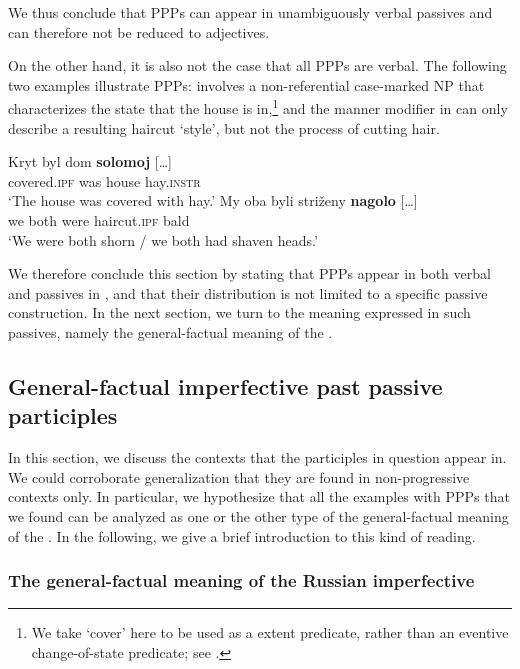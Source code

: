 \documentclass[output=paper,modfonts,newtxmath,hidelinks
\ChapterDOI{10.5281/zenodo.2545513}
]{langscibook}
\begin{document}
\noindent We thus conclude that  PPPs can appear in unambiguously verbal passives and can therefore not be reduced to adjectives. 

On the other hand, it is also not the case that all  PPPs are verbal. The following two examples illustrate  PPPs:  involves a non-referential  case-marked NP that characterizes the state that the house is in,\footnote{We take `cover' here to be used as a  extent predicate, rather than an eventive change-of-state predicate; see \citet{gawron09}.} and the  manner modifier in  can only describe a resulting haircut `style', but not the process of cutting hair.

\ea\label{kryt}
\ea\gll 	Kryt byl dom \textbf{solomoj} [\dots]\\ 		
	covered.\textsc{ipf} was house hay.\textsc{instr} 	\\
\glt	`The house was covered with hay.'\label{kryta}
\ex\gll	My oba byli striženy \textbf{nagolo} [\dots]\\
	we both were haircut.\textsc{ipf} bald\\
\glt	`We were both shorn / we both had shaven heads.'\label{nagolo} 
\z\z

\noindent We therefore conclude this section by stating that  PPPs appear in both verbal and  passives in , and that their distribution is not limited to a specific passive construction. In the next section, we turn to the meaning expressed in such passives, namely the general-factual meaning of the .

\subsection{General-factual imperfective past passive participles} 
\label{whichIPF}

In this section, we discuss the  contexts that the participles in question appear in. We could corroborate  generalization that they are found in non-progressive  contexts only. In particular, we hypothesize that all the examples with  PPPs that we found can be analyzed as one or the other type of the general-factual meaning of the . In the following, we give a brief introduction to this kind of reading.

\subsubsection{The general-factual meaning of the Russian imperfective}
\label{OF}
\end{document}
